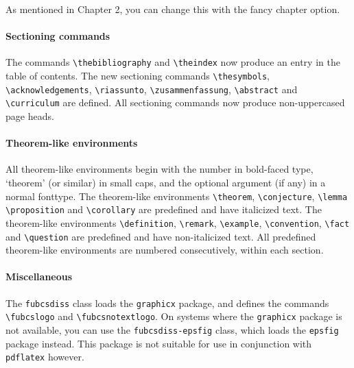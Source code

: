 As mentioned in Chapter 2, you can change this with the fancy chapter option.

\paragraph*{Sectioning commands}
The commands \verb|\thebibliography| and \verb|\theindex| now
produce an entry in the table of contents.
The new sectioning commands \verb|\thesymbols|, \verb|\acknowledgements|,
\verb|\riassunto|, \verb|\zusammenfassung|, \verb|\abstract| and \verb|\curriculum| are defined.
All sectioning commands now produce non-uppercased page heads.

\paragraph*{Theorem-like environments}
All theorem-like environments begin with the number in bold-faced type,
`theorem' (or similar) in small caps,
and the optional argument (if any) in a normal fonttype.
The theorem-like environments
\verb|\theorem|,
\verb|\conjecture|,
\verb|\lemma|
\verb|\proposition| and
\verb|\corollary|
are predefined and have italicized text.
The theorem-like environments
\verb|\definition|,
\verb|\remark|,
\verb|\example|,
\verb|\convention|,
\verb|\fact| and
\verb|\question|
are predefined and have non-italicized text.
All predefined theorem-like environments are numbered consecutively,
within each section.

\paragraph*{Miscellaneous}
The \verb|fubcsdiss| class loads the \verb|graphicx| package,
and defines the commands 
\verb|\fubcslogo| and \verb|\fubcsnotextlogo|.
On systems where the \verb|graphicx| package is not available, you
can use the \verb|fubcsdiss-epsfig| class, which loads the
\verb|epsfig| package instead. This package is not suitable for
use in conjunction with \verb|pdflatex| however.

